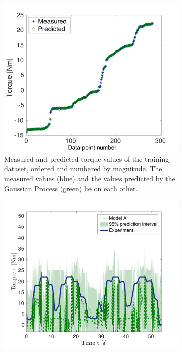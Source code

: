 \begin{figure}%
  \centering%
  \begin{subfigure}[t]{0.48\textwidth}%
    \centering%
    \includegraphics[width=\textwidth]{images/summer_school_study/measured_optimized_torque_A2.pdf}%
    \caption{Measured and predicted torque values of the training dataset, ordered and numbered by magnitude. The measured values (blue) and the values predicted by the Gaussian Process (green) lie on each other.}%
    \label{fig:measured_optimized_torque_A2}%
  \end{subfigure}%
  \quad
  \begin{subfigure}[t]{0.48\textwidth}%
    \centering%
    \includegraphics[width=\textwidth]{images/summer_school_study/validation_bv5_40_points_only_gamma_for_training.pdf}%

\end{subfigure}
\end{figure}
